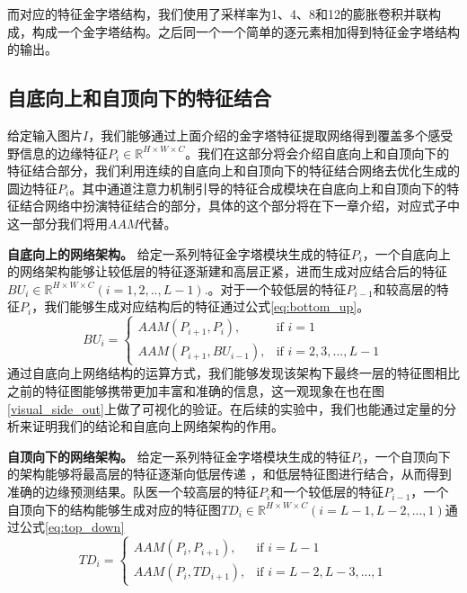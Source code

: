 \documentclass[master]{thesis-uestc}
\begin{document}
{而对应的特征金字塔结构，我们使用了采样率为1、4、8和12的膨胀卷积并联构成，构成一个金字塔结构。之后同一个一个简单的逐元素相加得到特征金字塔结构的输出。


\subsection{自底向上和自顶向下的特征结合}

给定输入图片$I$，我们能够通过上面介绍的金字塔特征提取网络得到覆盖多个感受野信息的边缘特征$P_i \in \mathbb{R}^{H \times W \times C}$。我们在这部分将会介绍自底向上和自顶向下的特征结合部分，我们利用连续的自底向上和自顶向下的特征结合网络去优化生成的圆边特征$P_i$。其中通道注意力机制引导的特征合成模块在自底向上和自顶向下的特征结合网络中扮演特征结合的部分，具体的这个部分将在下一章介绍，对应式子中这一部分我们将用$AAM$代替。

\textbf{自底向上的网络架构。} 给定一系列特征金字塔模块生成的特征$P_i$，一个自底向上的网络架构能够让较低层的特征逐渐建和高层正紧，进而生成对应结合后的特征$BU_i\in \mathbb{R}^{H \times W \times C}(i=1,2,..,L-1)$.。对于一个较低层的特征$P_{i-1}$和较高层的特征$P_i$，我们能够生成对应结构后的特征通过公式\eqref{eq:bottom_up}。
\begin{equation}
    BU_i =
    \begin{cases}
    AAM(P_{i+1}, P_{i}), &\text{if $i = 1$} \\
    AAM(P_{i+1}, BU_{i-1}), &\text{if $i = 2,3,...,L-1$}
    \end{cases}
    \label{eq:bottom_up}
 \end{equation}
通过自底向上网络结构的运算方式，我们能够发现该架构下最终一层的特征图相比之前的特征图能够携带更加丰富和准确的信息，这一观现象在也在图\ref{visual_side_out}上做了可视化的验证。在后续的实验中，我们也能通过定量的分析来证明我们的结论和自底向上网络架构的作用。

\textbf{自顶向下的网络架构。} 给定一系列特征金字塔模块生成的特征$P_i$，一个自顶向下的架构能够将最高层的特征逐渐向低层传递 ，和低层特征图进行结合，从而得到准确的边缘预测结果。队医一个较高层的特征$P_i$和一个较低层的特征$P_{i-1}$，一个自顶向下的结构能够生成对应的特征图$TD_i\in \mathbb{R}^{H \times W \times C}(i=L-1,L-2,...,1)$通过公式\eqref{eq:top_down}
\begin{equation}
    TD_i \!\!=\!\!
    \begin{cases}
     {AAM}(P_i, P_{i+1}), \! &\text{if $i = L-1$}\\
     {AAM}(P_i, TD_{i+1}),\! &\text{if $i = L\!-\!2, L\!-\!3,...,1$}
    \end{cases} 
    \label{eq:top_down}
\end{equation}

}
\end{document}
